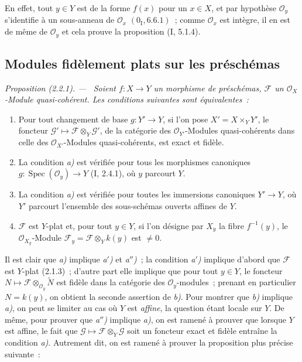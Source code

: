 \documentclass[10pt,oneside]{book}
\newenvironment{proposition}[1][]{%
  \par\medskip\noindent\itshape Proposition (#1). ---\ }{\par}
\begin{document}
En effet, tout $y\in Y$ est de la forme $f(x)$ pour un $x\in X$, et par
hypothèse $\mathcal O_y$ s'identifie à un sous-anneau de $\mathcal O_x$
$(0_{\mathrm I},6.6.1)$~; comme $\mathcal O_x$ est intègre, il en est de même
de $\mathcal O_y$ et cela prouve la proposition (I, 5.1.4).

\subsection{Modules fidèlement plats sur les préschémas}
\label{subsection:IV.2.2-fr}

\begin{proposition}[2.2.1]
\label{IV.2.2.1-fr}
Soient $f:X\to Y$ un morphisme de préschémas, $\mathscr F$ un
$\mathcal O_X$-Module quasi-cohérent. Les conditions suivantes sont
équivalentes~:
\begin{enumerate}
\item[\emph{a)}] Pour tout changement de base $g:Y'\to Y$, si l'on pose
$X'=X\times_Y Y'$, le foncteur
$\mathscr G'\mapsto\mathscr F\otimes_Y\mathscr G'$, de la catégorie des
$\mathcal O_{Y'}$-Modules quasi-cohérents dans celle des
$\mathcal O_{X'}$-Modules quasi-cohérents, est exact et fidèle.
\item[\emph{a$'$)}] La condition \emph{a)} est vérifiée pour tous les
morphismes canoniques $g:\operatorname{Spec}(\mathcal O_y)\to Y$ (I, 2.4.1),
où $y$ parcourt $Y$.
\item[\emph{a$''$)}] La condition \emph{a)} est vérifiée pour toutes les
immersions canoniques $Y'\to Y$, où $Y'$ parcourt l'ensemble des
sous-schémas ouverts affines de $Y$.
\item[\emph{b)}] $\mathscr F$ est $Y$-plat et, pour tout $y\in Y$, si l'on
désigne par $X_y$ la fibre $f^{-1}(y)$, le $\mathcal O_{X_y}$-Module
$\mathscr F_y=\mathscr F\otimes_Y k(y)$ est $\neq0$.
\end{enumerate}
\end{proposition}

Il est clair que \emph{a)} implique \emph{a$'$)} et \emph{a$''$)}~; la
condition \emph{a$'$)} implique d'abord que $\mathscr F$ est $Y$-plat
(2.1.3)~; d'autre part elle implique que pour tout $y\in Y$, le foncteur
$N\mapsto\mathscr F\otimes_{\mathcal O_y}\widetilde N$ est fidèle dans la
catégorie des $\mathcal O_y$-modules~; prenant en particulier $N=k(y)$, on
obtient la seconde assertion de \emph{b)}. Pour montrer que \emph{b)}
implique \emph{a)}, on peut se limiter au cas où $Y$ est \emph{affine}, la
question étant locale sur $Y$. De même, pour prouver que \emph{a$''$)}
implique \emph{a)}, on est ramené à prouver que lorsque $Y$ est affine, le
fait que $\mathscr G\mapsto\mathscr F\otimes_Y\mathscr G$ soit un foncteur
exact et fidèle entraîne la condition \emph{a)}. Autrement dit, on est ramené
à prouver la proposition plus précise suivante~:
\end{document}
